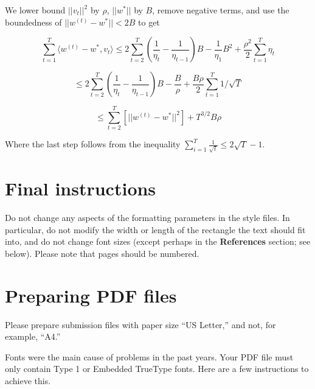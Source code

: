 \documentclass{article}
\begin{document}
We lower bound \(||v_t||^2\) by \(\rho\), \(||w^*||\) by \(B\), remove
negative terms, and use the boundedness of \(||w^{(t)} - w^*|| < 2B\) to get 


\[
\sum_{t=1}^T\langle w^{(t)} - w^*, v_t \rangle \leq 2\sum_{t=2}^T\left(\frac{1}{\eta_t} - \frac{1}{\eta_{t-1}}\right)B   - \frac{1}{\eta_1}B^2 + \frac{\rho^2}{2}  \sum_{t=1}^T \eta_t
\]

\[
\leq 2\sum_{t=2}^T\left(\frac{1}{\eta_t} - \frac{1}{\eta_{t-1}}\right)B  - \frac{B}{\rho} + \frac{B\rho}{2}  \sum_{t=1}^T 1/\sqrt{T}
\]

\[
\leq \sum_{t=2}^T\left[ ||w^{(t)} - w^*||^2   \right]  + T^{3/2}B\rho
\]

Where the last step follows from the inequality $\sum_{i=1}^T \frac{1}{\sqrt{t}} \leq 2 \sqrt{T} - 1$. 


\section{Final instructions}

Do not change any aspects of the formatting parameters in the style files.  In
particular, do not modify the width or length of the rectangle the text should
fit into, and do not change font sizes (except perhaps in the
\textbf{References} section; see below). Please note that pages should be
numbered.

\section{Preparing PDF files}

Please prepare submission files with paper size ``US Letter,'' and not, for
example, ``A4.''

Fonts were the main cause of problems in the past years. Your PDF file must only
contain Type 1 or Embedded TrueType fonts. Here are a few instructions to
achieve this.
\end{document}
